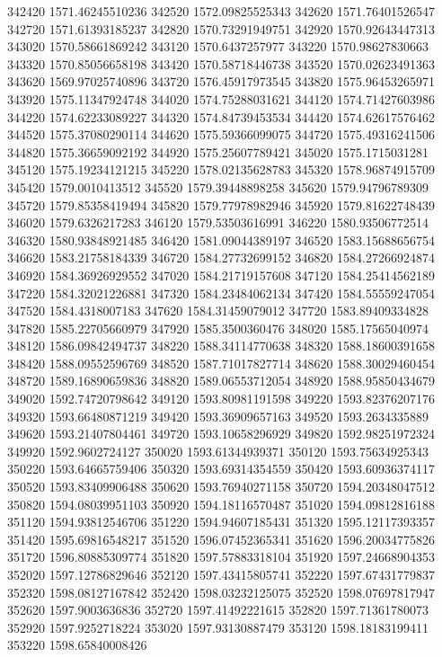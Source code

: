 {342420 1571.46245510236
342520 1572.09825525343
342620 1571.76401526547
342720 1571.61393185237
342820 1570.73291949751
342920 1570.92643447313
343020 1570.58661869242
343120 1570.6437257977
343220 1570.98627830663
343320 1570.85056658198
343420 1570.58718446738
343520 1570.02623491363
343620 1569.97025740896
343720 1576.45917973545
343820 1575.96453265971
343920 1575.11347924748
344020 1574.75288031621
344120 1574.71427603986
344220 1574.62233089227
344320 1574.84739453534
344420 1574.62617576462
344520 1575.37080290114
344620 1575.59366099075
344720 1575.49316241506
344820 1575.36659092192
344920 1575.25607789421
345020 1575.1715031281
345120 1575.19234121215
345220 1578.02135628783
345320 1578.96874915709
345420 1579.0010413512
345520 1579.39448898258
345620 1579.94796789309
345720 1579.85358419494
345820 1579.77978982946
345920 1579.81622748439
346020 1579.6326217283
346120 1579.53503616991
346220 1580.93506772514
346320 1580.93848921485
346420 1581.09044389197
346520 1583.15688656754
346620 1583.21758184339
346720 1584.27732699152
346820 1584.27266924874
346920 1584.36926929552
347020 1584.21719157608
347120 1584.25414562189
347220 1584.32021226881
347320 1584.23484062134
347420 1584.55559247054
347520 1584.4318007183
347620 1584.31459079012
347720 1583.89409334828
347820 1585.22705660979
347920 1585.3500360476
348020 1585.17565040974
348120 1586.09842494737
348220 1588.34114770638
348320 1588.18600391658
348420 1588.09552596769
348520 1587.71017827714
348620 1588.30029460454
348720 1589.16890659836
348820 1589.06553712054
348920 1588.95850434679
349020 1592.74720798642
349120 1593.80981191598
349220 1593.82376207176
349320 1593.66480871219
349420 1593.36909657163
349520 1593.2634335889
349620 1593.21407804461
349720 1593.10658296929
349820 1592.98251972324
349920 1592.9602724127
350020 1593.61344939371
350120 1593.75634925343
350220 1593.64665759406
350320 1593.69314354559
350420 1593.60936374117
350520 1593.83409906488
350620 1593.76940271158
350720 1594.20348047512
350820 1594.08039951103
350920 1594.18116570487
351020 1594.09812816188
351120 1594.93812546706
351220 1594.94607185431
351320 1595.12117393357
351420 1595.69816548217
351520 1596.07452365341
351620 1596.20034775826
351720 1596.80885309774
351820 1597.57883318104
351920 1597.24668904353
352020 1597.12786829646
352120 1597.43415805741
352220 1597.67431779837
352320 1598.08127167842
352420 1598.03232125075
352520 1598.07697817947
352620 1597.9003636836
352720 1597.41492221615
352820 1597.71361780073
352920 1597.9252718224
353020 1597.93130887479
353120 1598.18183199411
353220 1598.65840008426
}
